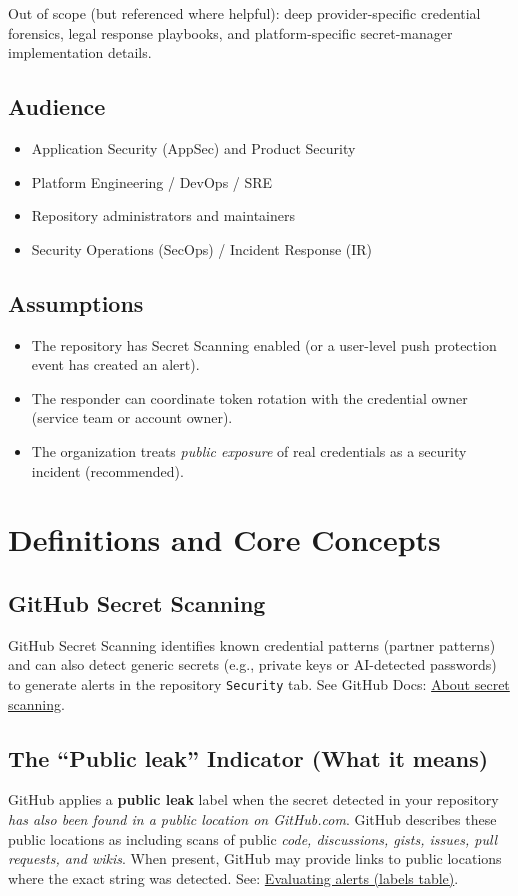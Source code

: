 \documentclass[11pt]{article}
\providecommand{\term}[1]{\textbf{#1}}
\newcommand{\codeinline}[1]{\texttt{#1}}
\begin{document}
Out of scope (but referenced where helpful): deep provider-specific credential forensics, legal response playbooks, and platform-specific secret-manager implementation details.

\subsection{Audience}
\begin{itemize}
  \item Application Security (AppSec) and Product Security
  \item Platform Engineering / DevOps / SRE
  \item Repository administrators and maintainers
  \item Security Operations (SecOps) / Incident Response (IR)
\end{itemize}

\subsection{Assumptions}
\begin{itemize}
  \item The repository has Secret Scanning enabled (or a user-level push protection event has created an alert).
  \item The responder can coordinate token rotation with the credential owner (service team or account owner).
  \item The organization treats \emph{public exposure} of real credentials as a security incident (recommended).
\end{itemize}

\section{Definitions and Core Concepts}
\subsection{GitHub Secret Scanning}
GitHub Secret Scanning identifies known credential patterns (partner patterns) and can also detect generic secrets (e.g., private keys or AI-detected passwords) to generate alerts in the repository \codeinline{Security} tab. See GitHub Docs: \href{https://docs.github.com/code-security/secret-scanning/about-secret-scanning}{About secret scanning}.

\subsection{The ``Public leak'' Indicator (What it means)}
GitHub applies a \term{public leak} label when the secret detected in your repository \emph{has also been found in a public location on GitHub.com}. GitHub describes these public locations as including scans of public \emph{code, discussions, gists, issues, pull requests, and wikis}. When present, GitHub may provide links to public locations where the exact string was detected. See: \href{https://docs.github.com/en/enterprise-cloud@latest/code-security/tutorials/remediate-leaked-secrets/evaluating-alerts}{Evaluating alerts (labels table)}.
\end{document}
